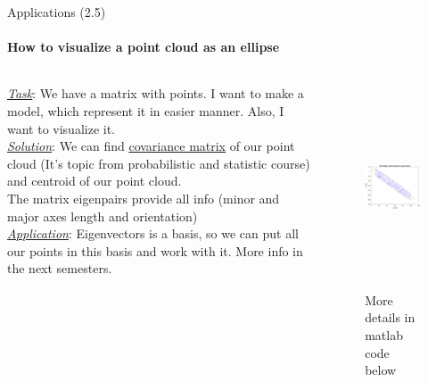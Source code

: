 \documentclass[aspectratio=169]{beamer}
\newcommand{\fbckg}[1]{\usebackgroundtemplate{\texttt{[image: \#1]}}}%
\begin{document}
\begin{frame}[t]{Applications (2.5)}
\framesubtitle{How to visualize a point cloud as an ellipse}
\vspace{-0.5cm}
    \begin{columns}[T,onlytextwidth]
        \begin{column}{0.55\textwidth}
            \textit{\underline{Task}}: We have a matrix with points. I want to make a model, which represent it in easier manner. Also, I want to visualize it. \\
\underline{\textit{Solution}}: We can find \href{https://www.youtube.com/watch?v=0GzMcUy7ZI0&feature=youtu.be}{covariance matrix} of our point cloud (It's topic from probabilistic and statistic course) and centroid of our point cloud. \\
The matrix eigenpairs provide all info (minor and major axes length and orientation) \\ 
\underline{\textit{Application}}: Eigenvectors is a basis, so we can put all our points in this basis and work with it. More info in the next semesters.
        \end{column}
        \begin{column}{0.44\textwidth}
            \vspace{-0.7cm}
            \begin{figure}[H]
                \centering\includegraphics[height=6cm,width=1\textwidth,keepaspectratio]{ellipse_point_cloud.png}
                \caption*{\large More details in matlab code below}
                \label{fig:ellipse_point_cloud.png}
            \end{figure}
        \end{column}
    \end{columns}
\end{frame}

\usebackgroundtemplate{}

\fbckg{fibeamer/figs/common.png}
\end{document}
